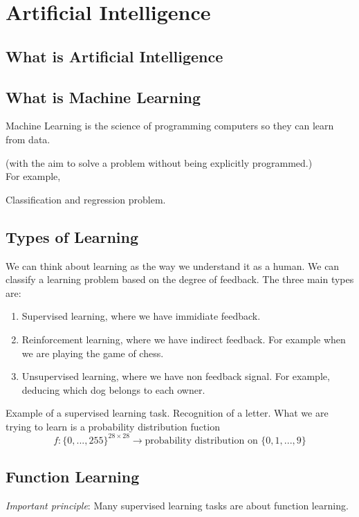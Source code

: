 \documentclass[../main.tex]{subfiles}
\begin{document}
	\chapter{Artificial Intelligence} \label{ch:machine}
	
	\section{What is Artificial Intelligence}
	\section{What is Machine Learning}
	\noindent Machine Learning is the science of programming computers so they can learn from data. 
	
	(with the aim to solve a problem without being explicitly programmed.) \\ 
	
	For example, 
	
	Classification and regression problem. 
	

	\section{Types of Learning}
	\noindent
	We can think about learning as the way we understand it as a human. We can classify a learning problem based on the degree of feedback. The three main types are: 
	\begin{enumerate}
		\item Supervised learning, where we have immidiate feedback. %
		\item Reinforcement learning, where we have indirect feedback. %
		 For example when we are playing the game of chess.
		\item Unsupervised learning, where we have non feedback signal. %
		For example, deducing which dog belongs to each owner.  
	\end{enumerate}
\begin{xmpl}
Example of a supervised learning task. Recognition of a letter. What we are trying to learn is a probability distribution fuction 
$$f: \{0,..., 255\}^{28 \times 28} \longrightarrow \text{probability distribution on } \{0,1,...,9\}$$
\end{xmpl}
	\section{Function Learning}
	\noindent
	\textit{Important principle}: Many supervised learning tasks are about function learning. 
\end{document}
